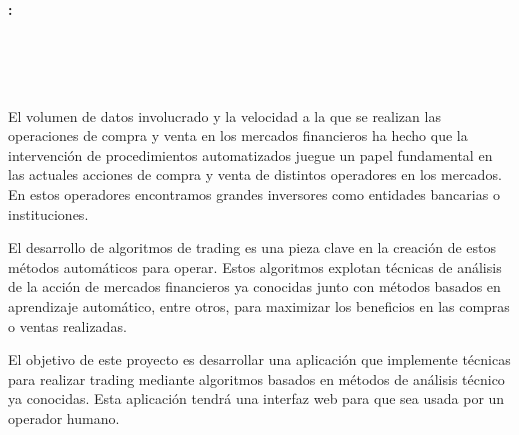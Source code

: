 \chapter*{}






\cleardoublepage
\thispagestyle{empty}

\begin{center}
{\large\bfseries \myTitle: \mySubtitle}\\
\end{center}
\begin{center}
\myName\\
\end{center}

\\

\vspace{0.7cm}
\\

El volumen de datos involucrado y la velocidad a la que se realizan las operaciones de compra y venta en los mercados financieros ha hecho que la intervención de procedimientos automatizados juegue un papel fundamental en las actuales acciones de compra y venta de distintos operadores en los mercados. En estos operadores encontramos grandes inversores como entidades bancarias o instituciones.\newline

El desarrollo de algoritmos de trading es una pieza clave en la creación de estos métodos automáticos para operar. Estos algoritmos explotan técnicas de análisis de la acción de mercados financieros ya conocidas junto con métodos basados en aprendizaje automático, entre otros, para maximizar los beneficios en las compras o ventas realizadas. \newline


El objetivo de este proyecto es desarrollar una aplicación que implemente técnicas para realizar trading mediante algoritmos basados en métodos de análisis técnico ya conocidas. Esta aplicación tendrá una interfaz web para que sea usada por un operador humano.

\cleardoublepage


\thispagestyle{empty}


